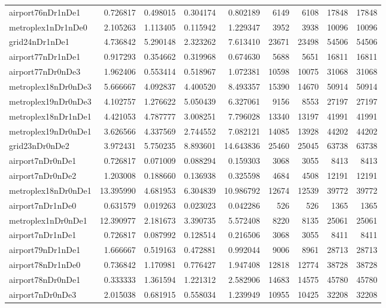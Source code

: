 \begin{longtable}{|l|r|r|r|r|r|r|r|r|}
airport76nDr1nDe1 & 0.726817 & 0.498015 & 0.304174 & 0.802189 & 6149 & 6108 & 17848 & 17848 \\
metroplex1nDr1nDe0 & 2.105263 & 1.113405 & 0.115942 & 1.229347 & 3952 & 3938 & 10096 & 10096 \\
grid24nDr1nDe1 & 4.736842 & 5.290148 & 2.323262 & 7.613410 & 23671 & 23498 & 54506 & 54506 \\
airport77nDr1nDe1 & 0.917293 & 0.354662 & 0.319968 & 0.674630 & 5688 & 5651 & 16811 & 16811 \\
airport77nDr0nDe3 & 1.962406 & 0.553414 & 0.518967 & 1.072381 & 10598 & 10075 & 31068 & 31068 \\
metroplex18nDr0nDe3 & 5.666667 & 4.092837 & 4.400520 & 8.493357 & 15390 & 14670 & 50914 & 50914 \\
metroplex19nDr0nDe3 & 4.102757 & 1.276622 & 5.050439 & 6.327061 & 9156 & 8553 & 27197 & 27197 \\
metroplex18nDr1nDe1 & 4.421053 & 4.787777 & 3.008251 & 7.796028 & 13340 & 13197 & 41991 & 41991 \\
metroplex19nDr0nDe1 & 3.626566 & 4.337569 & 2.744552 & 7.082121 & 14085 & 13928 & 44202 & 44202 \\
grid23nDr0nDe2 & 3.972431 & 5.750235 & 8.893601 & 14.643836 & 25460 & 25045 & 63738 & 63738 \\
airport7nDr0nDe1 & 0.726817 & 0.071009 & 0.088294 & 0.159303 & 3068 & 3055 & 8413 & 8413 \\
airport7nDr0nDe2 & 1.203008 & 0.188660 & 0.136938 & 0.325598 & 4684 & 4508 & 12191 & 12191 \\
metroplex18nDr0nDe1 & 13.395990 & 4.681953 & 6.304839 & 10.986792 & 12674 & 12539 & 39772 & 39772 \\
airport7nDr1nDe0 & 0.631579 & 0.019263 & 0.023023 & 0.042286 & 526 & 526 & 1365 & 1365 \\
metroplex1nDr0nDe1 & 12.390977 & 2.181673 & 3.390735 & 5.572408 & 8220 & 8135 & 25061 & 25061 \\
airport7nDr1nDe1 & 0.726817 & 0.087992 & 0.128514 & 0.216506 & 3068 & 3055 & 8411 & 8411 \\
airport79nDr1nDe1 & 1.666667 & 0.519163 & 0.472881 & 0.992044 & 9006 & 8961 & 28713 & 28713 \\
airport78nDr1nDe0 & 0.736842 & 1.170981 & 0.776427 & 1.947408 & 12818 & 12774 & 38728 & 38728 \\
airport78nDr0nDe1 & 0.333333 & 1.361594 & 1.221312 & 2.582906 & 14683 & 14575 & 45780 & 45780 \\
airport7nDr0nDe3 & 2.015038 & 0.681915 & 0.558034 & 1.239949 & 10955 & 10425 & 32208 & 32208 \\

\end{longtable}
